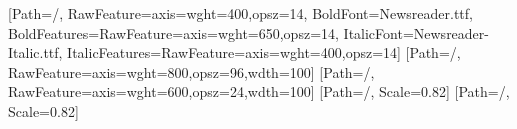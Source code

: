 \usepackage[a4paper,margin=15mm,top=12mm,bottom=20mm,footskip=11mm]{geometry}
\usepackage{fontspec}
\setmainfont{Newsreader.ttf}[Path=\cvfonts/, RawFeature={axis={wght=400,opsz=14}},
  BoldFont=Newsreader.ttf, BoldFeatures={RawFeature={axis={wght=650,opsz=14}}},
  ItalicFont=Newsreader-Italic.ttf, ItalicFeatures={RawFeature={axis={wght=400,opsz=14}}}]
\newfontfamily{}[Path=\cvfonts/, RawFeature={axis={wght=800,opsz=96,wdth=100}}]
\newfontfamily{}[Path=\cvfonts/, RawFeature={axis={wght=600,opsz=24,wdth=100}}]
\newfontfamily{}[Path=\cvfonts/, Scale=0.82]
\setmonofont{JetBrainsMono-Regular.ttf}[Path=\cvfonts/, Scale=0.82]
\usepackage{xcolor}
\pagecolor{night}\color{ink}
\usepackage{graphicx}
\usepackage{multicol}
\usepackage{luacolor}
\usepackage{lua-ul}
\usepackage{enumitem}
\usepackage{hyperref}
\pagestyle{empty}
\setlength{\parindent}{0pt}\setlength{\parskip}{4pt}
\linespread{1.12}\raggedright
\setlength{\columnsep}{9mm}
\newcommand{\cvlink}[1]{{\underLine[color=muted,top=-1.6pt,bottom=-2pt]{#1}}}
\newcommand{\cvdata}{\mono\color{muted}\small}
\newcommand{\cvdoi}[1]{{\mono\footnotesize\color{muted}\underLine[color=rule,top=-1.6pt,bottom=-2pt]{#1}}}
\newcommand{\cvname}[1]{{\display\fontsize{40}{40}\selectfont\color{ideas}#1\par}\vspace{-3pt}}
\newenvironment{cvepithet}{\displaysemi\fontsize{15}{17}\selectfont\color{water}}{\par\vspace{5pt}}
\newenvironment{cvlede}{\fontsize{12}{17.5}\selectfont}{\par\vspace{4pt}}
